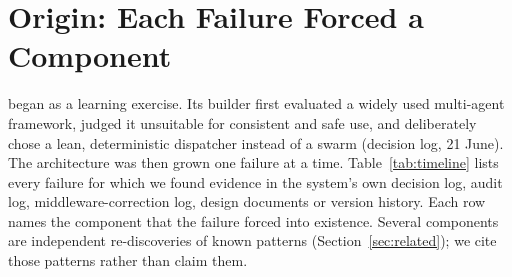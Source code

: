 \section{Origin: Each Failure Forced a Component}\label{sec:timeline}
\sys{} began as a learning exercise. Its builder first evaluated a widely used multi-agent framework, judged it unsuitable for consistent and safe use, and deliberately chose a lean, deterministic dispatcher instead of a swarm (decision log, 21 June). The architecture was then grown one failure at a time. Table~\ref{tab:timeline} lists every failure for which we found evidence in the system's own decision log, audit log, middleware-correction log, design documents or version history. Each row names the component that the failure forced into existence. Several components are independent re-discoveries of known patterns (Section~\ref{sec:related}); we cite those patterns rather than claim them.

